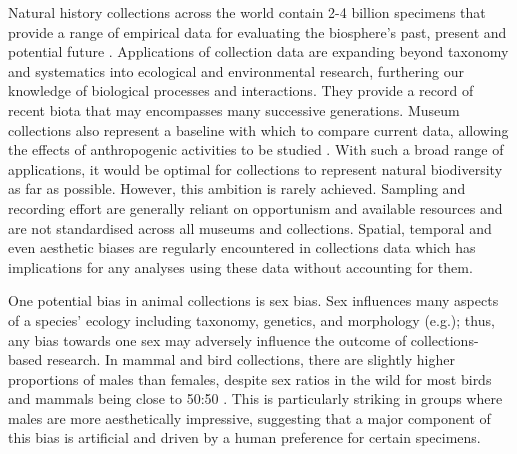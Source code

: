 \documentclass[a4paper, 12pt]{article}
\begin{document}
Natural history collections across the world contain 2-4 billion specimens that provide a range of empirical data for evaluating the biosphere's past, present and potential future \cite{meineke2018biological}. 
Applications of collection data are expanding beyond taxonomy and systematics into ecological and environmental research, furthering our knowledge of biological processes and interactions\cite{mclean2015natural}. 
They provide a record of recent biota that may encompasses many successive generations. 
Museum collections also represent a baseline with which to compare current data, allowing the effects of anthropogenic activities to be studied \cite{lister2011natural,meineke2018biological,modica2020surrounded,buckingham2021using}. 
With such a broad range of applications, it would be optimal for collections to represent natural biodiversity as far as possible. 
However, this ambition is rarely achieved. 
Sampling and recording effort are generally reliant on opportunism and available resources and are not standardised across all museums and collections\cite{pyke2010biological,daru2018widespread,cooper2019sex}. 
Spatial, temporal and even aesthetic biases are regularly encountered in collections data\cite{pyke2010biological} which has implications for any analyses using these data without accounting for them\cite{daru2018widespread}. 

One potential bias in animal collections is sex bias. 
Sex influences many aspects of a species' ecology including taxonomy, genetics, and morphology (e.g.\cite{shine2005ecological}); thus, any bias towards one sex may adversely influence the outcome of collections-based research\cite{cooper2019sex}. 
In mammal and bird collections, there are slightly higher proportions of males than females\cite{machin2008,cooper2019sex,gower2019}, despite sex ratios in the wild for most birds and mammals being close to 50:50 \cite{karlin1986theoretical,szekely2014sex}. 
This is particularly striking in groups where males are more aesthetically impressive\cite{pyke2010biological,cooper2019sex}, suggesting that a major component of this bias is artificial and driven by a human preference for certain specimens. 
\end{document}
